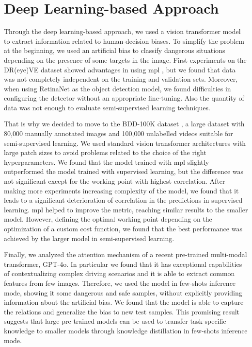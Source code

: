 \section{Deep Learning-based Approach}
Through the deep learning-based approach, we used a vision transformer model
\cite{vit} 
to extract information related to human-decision biases. To simplify the problem 
at the beginning, we used an artificial bias to classify dangerous situations 
depending on the presence of some targets in the image. First experiments on 
the DR(eye)VE dataset \cite{dreyeve} showed advantages in using \acl{mpl} 
\cite{pham2021meta}, but we found that data was not completely independent on 
the training and validation sets. Moreover, when using RetinaNet \cite{retinanet}
as the object detection model, we found difficulties in configuring the detector 
without an appropriate fine-tuning. Also the quantity of data was not enough to 
evaluate semi-supervised learning techniques.

That is why we decided to move to the BDD-100K dataset \cite{bdd100k}, a large 
dataset with 80,000 manually annotated images and 100,000 unlabelled videos 
suitable for semi-supervised learning. We used standard vision transformer 
architectures with large patch sizes to avoid problems related to the choice 
of the right hyperparameters. We found that the model trained with \acl{mpl} 
slightly outperformed the model trained with supervised learning, but the 
difference was not significant except for the working point with highest 
correlation. After making more experiments increasing complexity of 
the model, we found that it leads to a significant deterioration of correlation in the predictions 
in supervised learning. \acl{mpl} helped to improve the metric, reaching 
similar results to the smaller model. However, defining the optimal working 
point depending on the optimization of a custom cost function, we found that 
the best performance was achieved by the larger model in semi-supervised learning.

Finally, we analyzed the attention mechanism of a recent pre-trained multi-modal 
transformer, GPT-4o. In particular we found that it has exceptional capabilities 
of contextualizing complex driving scenarios and it is able to extract common 
features from few images. Therefore, we used the model in few-shots inference 
mode, showing it some dangerous and safe samples, without explicitly providing 
information about the artificial bias. We found that the model is able to 
capture the relations and generalize the bias to new test samples.
This promising result suggests that large pre-trained models can be used to 
transfer task-specific knowledge to smaller models through knowledge distillation 
\cite{yu_knowledge_distillation} in few-shots inference mode.

